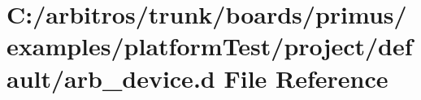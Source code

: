 \hypertarget{boards_2primus_2examples_2platform_test_2project_2default_2arb__device_8d}{\section{C\-:/arbitros/trunk/boards/primus/examples/platform\-Test/project/default/arb\-\_\-device.d File Reference}
\label{boards_2primus_2examples_2platform_test_2project_2default_2arb__device_8d}
}
